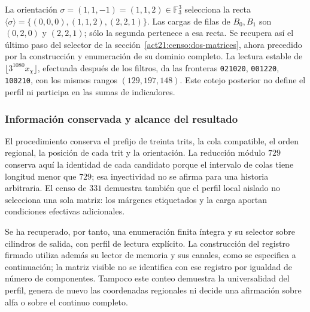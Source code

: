 La orientación \(\sigma=(1,1,-1)=(1,1,2)\in\mathbb F_3^3\)
selecciona la recta
\(\langle\sigma\rangle=\{(0,0,0),(1,1,2),(2,2,1)\}\).
Las cargas de filas de \(B_0,B_1\) son \((0,2,0)\) y \((2,2,1)\);
sólo la segunda pertenece a esa recta. Se recupera así el último paso
del selector de la sección~\ref{act21:censo:dos-matrices}, ahora precedido por
la construcción y enumeración de su dominio completo. La lectura estable
de \(\lfloor3^{1080}x_\chi\rfloor\), efectuada después de los filtros,
da las fronteras \texttt{021020}, \texttt{001220}, \texttt{100210},
con los mismos rangos \((129,197,148)\). Este cotejo posterior no define
el perfil ni participa en las sumas de indicadores.

\subsubsection{Información conservada y alcance del resultado}

El procedimiento conserva el prefijo de treinta trits, la cola compatible,
el orden regional, la posición de cada trit y la orientación. La reducción
módulo \(729\) conserva aquí la identidad de cada candidato porque el
intervalo de colas tiene longitud menor que \(729\); esa inyectividad
no se afirma para una historia arbitraria. El censo de \(331\) demuestra
también que el perfil local aislado no selecciona una sola matriz: los
márgenes etiquetados y la carga aportan condiciones efectivas adicionales.

Se ha recuperado, por tanto, una enumeración finita íntegra y su selector
sobre cilindros de salida, con perfil de lectura explícito. La construcción
del registro firmado utiliza además su lector de memoria y sus canales,
como se especifica a continuación; la matriz visible no se identifica con
ese registro por igualdad de número de componentes. Tampoco este conteo
demuestra la universalidad del perfil, genera de nuevo las coordenadas
regionales ni decide una afirmación sobre alfa o sobre el continuo completo.
